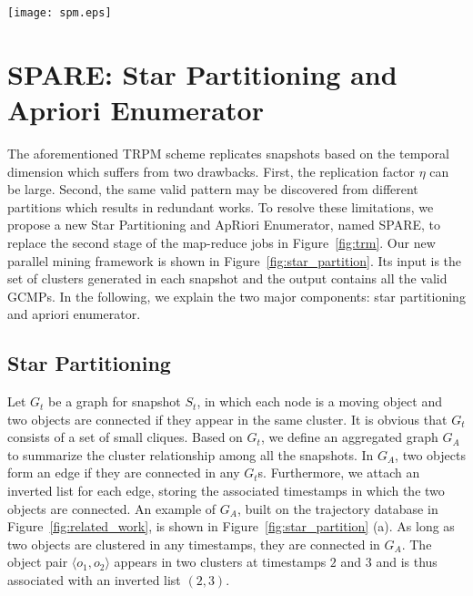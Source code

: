\begin{figure*}[t]
\centering
\texttt{[image: spm.eps]}
\caption{Star Partitioning and ApRiori Enumerator (SPARE). (a) Aggregated graph $G_A$ generated from Figure 1. (b) Five star partitions are generated from $G_A$. Star IDs are circled, vertexes and inverted lists are in the connected tables.
(c) Apriori Enumerator with various pruning techniques.}
\label{fig:star_partition}
\end{figure*}

\section{SPARE: Star Partitioning and Apriori Enumerator}
\label{sec:spm}
The aforementioned TRPM scheme replicates snapshots based on the temporal dimension which suffers from two drawbacks. First, the replication factor $\eta$ can be large. Second, the same valid pattern may be discovered from different partitions which results in redundant works.
To resolve these limitations,
we propose a new Star Partitioning and ApRiori Enumerator, named SPARE, 
to replace the second stage of the map-reduce jobs in Figure~\ref{fig:trm}. 
Our new parallel mining framework is shown in Figure~\ref{fig:star_partition}. 
Its input is the set of clusters generated in each snapshot and the output 
contains all the valid GCMPs. In the following, we explain the two major components: 
star partitioning and apriori enumerator.


\subsection{Star Partitioning}
Let $G_t$ be a graph for snapshot $S_t$, in which each node 
is a moving object and two objects are connected if they appear 
in the same cluster. It is obvious that $G_t$ consists of a set of small cliques. 
Based on $G_t$, we define an aggregated graph $G_A$ to summarize the 
cluster relationship among all the snapshots. In $G_A$, two objects
form an edge if they are connected in any $G_t$s. Furthermore, 
we attach an inverted list for each edge, 
storing the associated timestamps in which the two objects are connected. 
An example of $G_A$, built on the trajectory database in Figure~\ref{fig:related_work}, 
is shown in Figure~\ref{fig:star_partition} (a). 
As long as two objects are clustered in any timestamps, they are connected in $G_A$. 
The object pair $\langle o_1,o_2 \rangle$ appears in two clusters at timestamps 
$2$ and $3$ and is thus associated with an inverted list $(2,3)$.


